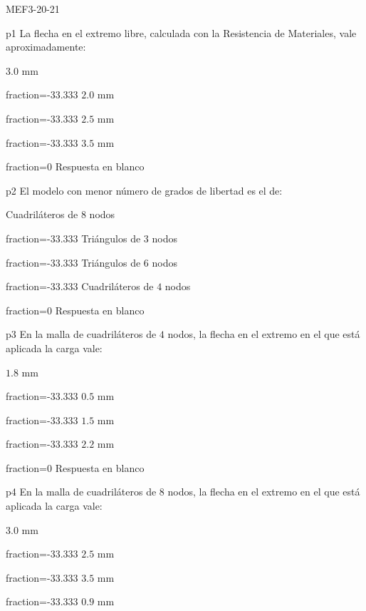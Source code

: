 \documentclass[a4paper]{article}
\begin{document}
\begin{quiz}{MEF3-20-21}

\begin{multi}{p1}
La flecha en el extremo libre, calculada con la Resistencia de Materiales,
vale aproximadamente:
	\item* $3.0$ mm
	\item[fraction=-33.333] $2.0$ mm
	\item[fraction=-33.333] $2.5$ mm
	\item[fraction=-33.333] $3.5$ mm
	\item[fraction=0] Respuesta en blanco
\end{multi}
\begin{multi}{p2}
	El modelo con menor n\'umero de grados de libertad es el de:
	\item* Cuadril\'ateros de $8$ nodos
	\item[fraction=-33.333]  Tri\'angulos de $3$ nodos
	\item[fraction=-33.333] Tri\'angulos de $6$ nodos
	\item[fraction=-33.333] Cuadril\'ateros de $4$ nodos
	\item[fraction=0] Respuesta en blanco
\end{multi}
\begin{multi}{p3}
En la malla de cuadril\'ateros de $4$ nodos, la flecha en el extremo
en el que est\'a aplicada la carga vale:
\item* $1.8$ mm
\item[fraction=-33.333] $0.5$ mm
\item[fraction=-33.333] $1.5$ mm
\item[fraction=-33.333] $2.2$ mm
\item[fraction=0] Respuesta en blanco
\end{multi}
\begin{multi}{p4}
En la malla de cuadril\'ateros de $8$ nodos, la flecha en el extremo
en el que est\'a aplicada la carga vale:
\item* $3.0$ mm
\item[fraction=-33.333] $2.5$ mm
\item[fraction=-33.333] $3.5$ mm
\item[fraction=-33.333] $0.9$ mm

\end{multi}
\end{quiz}
\end{document}
